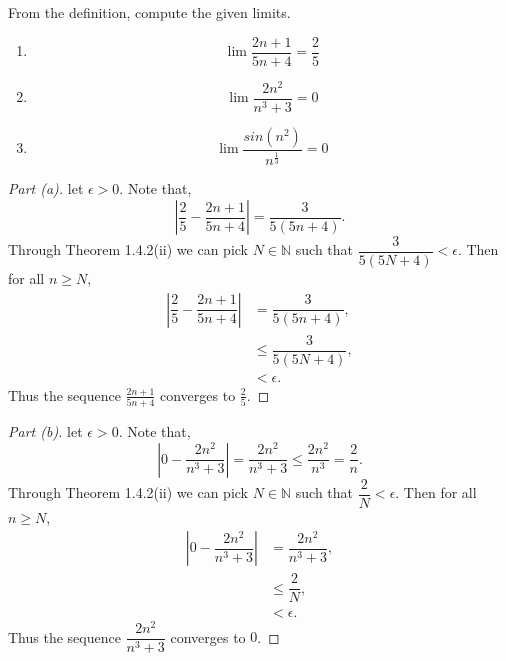 \documentclass[12pt]{article}
\makeatletter
\theoremstyle{homework}
\newenvironment{exercise}[1]
{\def\@currentlabel{#1}\exercisecore}
{\endexercisecore}
\newcommand{\Nats}{\ensuremath{\mathbb N}}
\makeatother
\begin{document}
\begin{exercise}{2.2.2}
From the definition, compute the given limits.
\begin{enumerate}
	\item[\textbf{a.}] 
	\begin{equation*}
		\lim \dfrac{2n+1}{5n+4} = \dfrac{2}{5}
	\end{equation*} 
	\item[\textbf{b.}]
	\begin{equation*}
		\lim \dfrac{2n^2}{n^3+3} = 0 
	\end{equation*}
	\item[\textbf{c.}] 
	\begin{equation*}
		\lim \dfrac{sin(n^2)}{n^\frac{1}{3}} = 0 
	\end{equation*} 
\end{enumerate}
\end{exercise}
\begin{proof}[Part (a)] let $\epsilon > 0$. Note that,
	\begin{equation*}
		|\dfrac{2}{5} - \dfrac{2n+1}{5n+4}| = \dfrac{3}{5(5n+4)}.
	\end{equation*}
	Through Theorem 1.4.2(ii) we can pick $N \in \Nats$ such that $\dfrac{3}{5(5N+4)}<\epsilon$. Then for all $n \geq N$,
	\begin{align*}
		|\dfrac{2}{5} - \dfrac{2n+1}{5n+4}| &= \dfrac{3}{5(5n+4)},\\
		&\le \dfrac{3}{5(5N+4)},\\
		&< \epsilon.
	\end{align*}
	Thus the sequence $\frac{2n+1}{5n+4}$ converges to $\frac{2}{5}$.  
\end{proof}
\begin{proof}[Part (b)] let $\epsilon > 0$. Note that,
	\begin{equation*}
		|0 - \dfrac{2n^2}{n^3+3}| = \dfrac{2n^2}{n^3+3} \le \dfrac{2n^2}{n^3} = \dfrac{2}{n}.
	\end{equation*}
	Through Theorem 1.4.2(ii) we can pick $N \in \Nats$ such that $\dfrac{2}{N}<\epsilon$. Then for all $n \geq N$,
	\begin{align*}
		|0 - \dfrac{2n^2}{n^3+3}| &= \dfrac{2n^2}{n^3+3},\\
		&\le \dfrac{2}{N},\\
		&< \epsilon.
	\end{align*}
	Thus the sequence $\dfrac{2n^2}{n^3+3}$ converges to $0$.  
\end{proof} 
\end{document}
